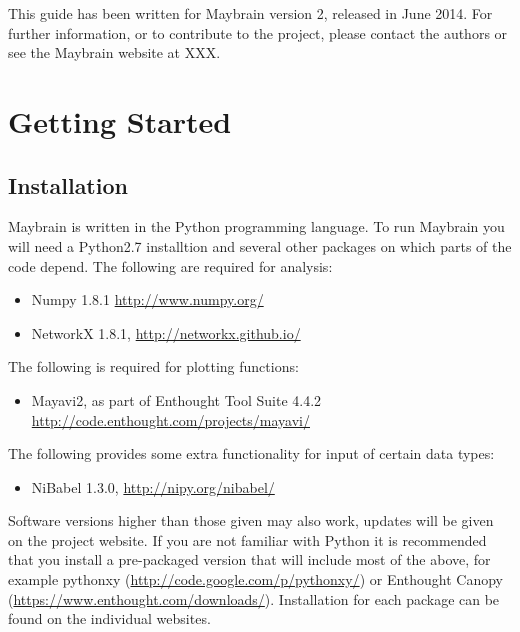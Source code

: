 \documentclass{report}
\begin{document}



This guide has been written for Maybrain version 2, released in June 2014. For further information, or to contribute to the project, please contact the authors or see the Maybrain website at XXX.




\chapter{Getting Started}

\section{Installation}
Maybrain is written in the Python programming language. To run Maybrain you will need a Python2.7 installtion and several other packages on which parts of the code depend. The following are required for analysis:

\begin{itemize}
\item Numpy 1.8.1 \url{http://www.numpy.org/}
\item NetworkX 1.8.1, \url{http://networkx.github.io/}
\end{itemize}

\noindent The following is required for plotting functions:

\begin{itemize}
\item Mayavi2, as part of Enthought Tool Suite 4.4.2 \url{http://code.enthought.com/projects/mayavi/}
\end{itemize}

\noindent The following provides some extra functionality for input of certain data types:

\begin{itemize}
\item NiBabel 1.3.0, \url{http://nipy.org/nibabel/}
\end{itemize}

\noindent Software versions higher than those given may also work, updates will be given on the project website. If you are not familiar with Python it is recommended that you install a pre-packaged version that will include most of the above, for example pythonxy (\url{http://code.google.com/p/pythonxy/}) or Enthought Canopy (\url{https://www.enthought.com/downloads/}). Installation for each package can be found on the individual websites.
\end{document}
